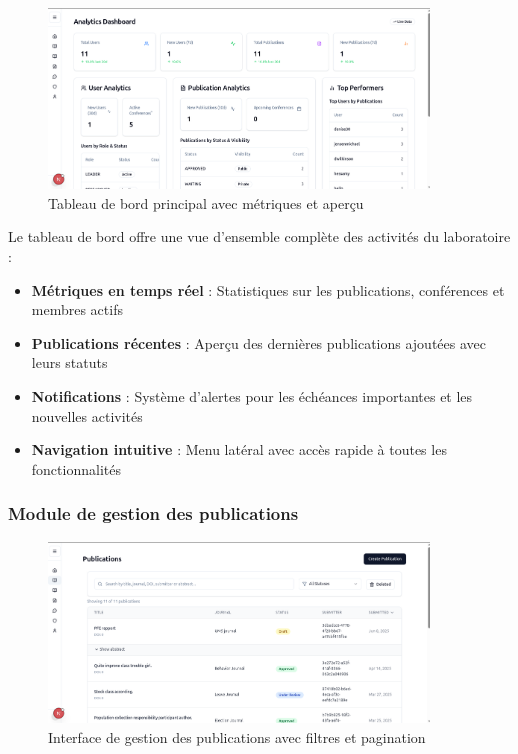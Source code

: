 \documentclass[12pt]{rapportPfe}
\begin{document}
\begin{figure}[H]
    \centering
    \includegraphics[width=0.9\textwidth]{diagrams/a_ss_08.png}
    \caption{Tableau de bord principal avec métriques et aperçu}
    \label{fig:dashboard}
\end{figure}

Le tableau de bord offre une vue d'ensemble complète des activités du laboratoire :
\begin{itemize}
    \item \textbf{Métriques en temps réel} : Statistiques sur les publications, conférences et membres actifs
    \item \textbf{Publications récentes} : Aperçu des dernières publications ajoutées avec leurs statuts
    \item \textbf{Notifications} : Système d'alertes pour les échéances importantes et les nouvelles activités
    \item \textbf{Navigation intuitive} : Menu latéral avec accès rapide à toutes les fonctionnalités
\end{itemize}

\subsubsection{Module de gestion des publications}

\begin{figure}[H]
    \centering
    \includegraphics[width=0.9\textwidth]{diagrams/a_ss_12.png}
    \caption{Interface de gestion des publications avec filtres et pagination}
    \label{fig:publications}
\end{figure}
\end{document}

